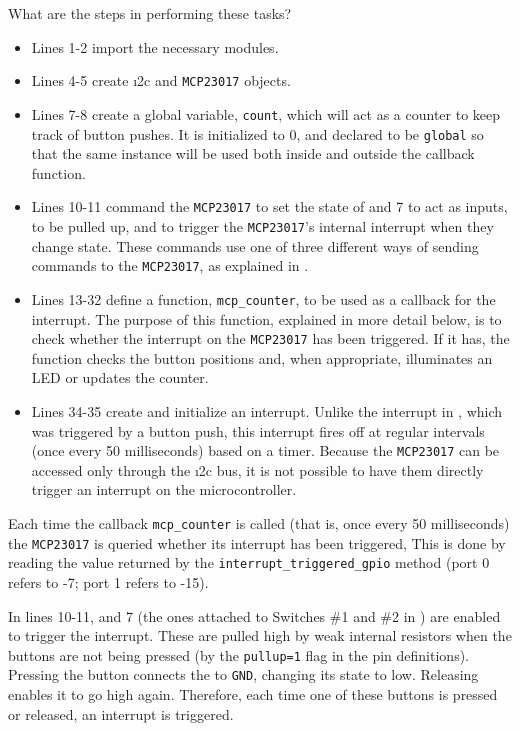 What are the steps in performing these tasks?
\begin{itemize}
\item Lines 1-2 import the necessary modules.
\item Lines 4-5 create \i2c and \texttt{MCP23017} objects.
\item Lines 7-8 create a global variable, \texttt{count}, which will act as a counter to keep track of button pushes.
It is initialized to 0, and declared to be \texttt{global} so that the same instance will be used both inside and outside the callback function.
\item Lines 10-11 command the \texttt{MCP23017} to set the state of  and 7 to act as inputs, to be pulled up, and to trigger the \texttt{MCP23017}'s internal interrupt when they change state.
These commands use one of three different ways of sending commands to the \texttt{MCP23017}, as explained in .
\item Lines 13-32 define a function, \lstinline{mcp_counter}, to be used as a callback for the interrupt.
The purpose of this function, explained in more detail below, is to check whether the interrupt on the \texttt{MCP23017} has been triggered.
If it has, the function checks the button positions and, when appropriate, illuminates an LED or updates the counter.
\item Lines 34-35 create and initialize an interrupt.
Unlike the interrupt in , which was triggered by a button push, this interrupt fires off at regular intervals (once every 50 milliseconds) based on a timer.
Because the \texttt{MCP23017} \gpios can be accessed only through the \i2c bus, it is not possible to have them directly trigger an interrupt on the microcontroller.
\end{itemize}

Each time the callback \lstinline{mcp_counter} is called (that is, once every 50 milliseconds) the \texttt{MCP23017} is queried whether its interrupt has been triggered,
This is done by reading the value returned by the \lstinline{interrupt_triggered_gpio} method (port 0 refers to -7; port 1 refers to -15).

In lines 10-11,  and 7 (the ones attached to Switches \#1 and \#2 in ) are enabled to trigger the interrupt.
These \gpios are pulled high by weak internal resistors when the buttons are not being pressed (by the \lstinline{pullup=1} flag in the pin definitions).
Pressing the button connects the \gpio to \texttt{GND}, changing its state to low.
Releasing enables it to go high again.
Therefore, each time one of these buttons is pressed or released, an interrupt is triggered.

